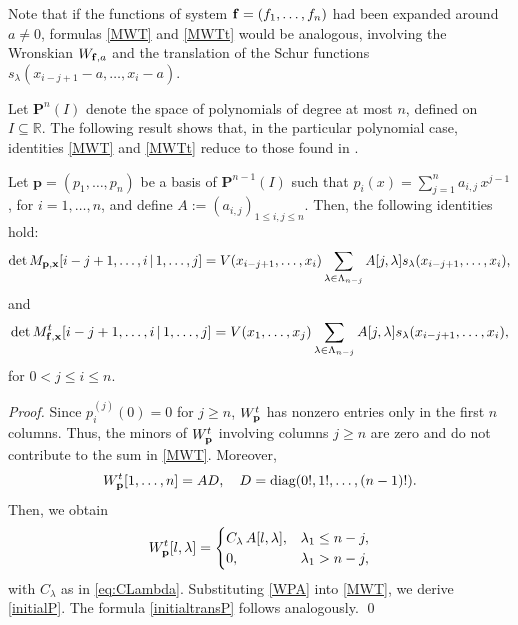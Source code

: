 \documentclass[smallextended]{svjour3}       %
\begin{document}
Note that if the functions of system ${\bf f}=(f_1,\ldots,f_n)$ had been expanded around $a\neq 0$,  formulas \eqref{MWT} and \eqref{MWTt}   would  be analogous, involving the Wronskian $W_{{\bf f},a} $ and the translation of the Schur functions $s_{\lambda}(x_{i-j+1}-a,\dots,x_i-a)$.

Let \( \mathbf{P}^{n}(I) \) denote the space of polynomials of degree at most \( n \), defined on \( I \subseteq \mathbb{R} \). 
The following result shows that, in the particular polynomial case, identities \eqref{MWT} and \eqref{MWTt} reduce to those found in \cite{DMR}.  

   
\begin{corollary} Let \( \mathbf{p} = (p_{1}, \ldots, p_{n}) \) be a basis of \( \mathbf{P}^{n-1}(I) \) such that  
\( p_{i}(x) = \sum_{j=1}^{n} a_{i,j}\,x^{j-1}\),  for \(i = 1, \dots, n\), and define \( A := (a_{i,j})_{1 \leq i,j \leq n} \). Then, the following identities hold:
    \begin{equation}\label{initialP}
 \det M_{\bf p, \bf x} {[i-j+1,\dots,i\,|\,1,\dots, j]}= V( x_{i-j+1},\dots,x_i) \sum_{ \lambda\in\Lambda_{n-j}}A{[j,\lambda]}s_{\lambda}(x_{i-j+1},\dots,x_i),
\end{equation}
and
\begin{equation}\label{initialtransP}
   \det M_{\bf f, \bf x}^t {[i-j+1,\dots,i\,|\,1,\dots, j]}
 = V(x_{1},\dots,x_j) \sum_{ \lambda\in\Lambda_{n-j}}A{[j,\lambda]}s_{\lambda}(x_{i-j+1},\dots,x_i),
\end{equation}  
for $0 < j \leq i \leq n$.
\end{corollary}
\begin{proof}

Since $p_i^{(j)}(0)=0$ for $j\ge n$,    \( W^t_{\bf p} \) has nonzero entries only in the first \( n \) columns. Thus, the minors of \( W^t_{\bf p} \) involving columns \( j \geq n \) are zero and do not contribute to the sum in \eqref{MWT}. 
 Moreover,
\[
W_{\bf p}^t[1,\ldots,n] =  A  D, \quad D=\textrm{diag}(0!, 1!,\ldots, (n-1)!).
\]
Then, we obtain  
\begin{equation}\label{WPA}
W^t_{\bf p}{[l,\lambda]} =
\begin{cases}  
C_\lambda \,A{[l,\lambda]}, & \lambda_1 \leq n-j, \\  
0, & \lambda_1 > n-j,
\end{cases}  
\end{equation}  
with $C_\lambda$ as in \eqref{eq:CLambda}. Substituting \eqref{WPA} into \eqref{MWT}, we derive \eqref{initialP}. The formula \eqref{initialtransP} follows analogously.  
\qed
\end{proof}
\end{document}
